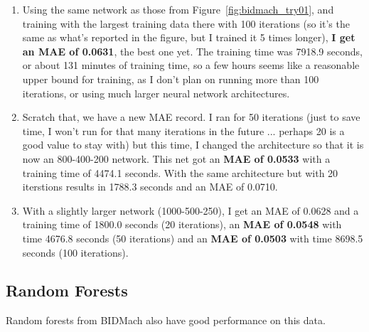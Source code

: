 \documentclass[a4paper, 11pt]{article}
\begin{document}
\begin{enumerate}
    \item Using the same network as those from Figure~\ref{fig:bidmach_try01}, and training with the
    largest training data there with 100 iterations (so it's the same as what's reported in the
    figure, but I trained it 5 times longer), \textbf{I get an MAE of 0.0631}, the best one yet. The
    training time was 7918.9 seconds, or about 131 minutes of training time, so a few hours seems
    like a reasonable upper bound for training, as I don't plan on running more than 100 iterations,
    or using much larger neural network architectures.

    \item Scratch that, we have a new MAE record. I ran for 50 iterations (just to save time, I
    won't run for that many iterations in the future ... perhaps 20 is a good value to stay with)
    but this time, I changed the architecture so that it is now an 800-400-200 network. This net got
    an \textbf{MAE of 0.0533} with a training time of 4474.1 seconds. With the same architecture but
    with 20 iterstions results in 1788.3 seconds and an MAE of 0.0710.

    \item With a slightly larger network (1000-500-250), I get an MAE of 0.0628 and a training time
    of 1800.0 seconds (20 iterations), an \textbf{MAE of 0.0548} with time 4676.8 seconds (50
    iterations) and an \textbf{MAE of 0.0503} with time 8698.5 seconds (100 iterations).
\end{enumerate}


\subsection{Random Forests}

Random forests from BIDMach also have good performance on this data.
\end{document}
